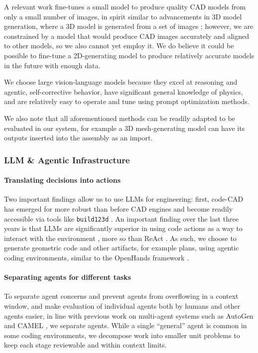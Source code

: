 \documentclass[conference]{IEEEtran}
\begin{document}
A relevant work \cite{ref39} fine-tunes a small model to produce quality CAD models from only a small number of images, in spirit similar to advancements in 3D model generation, where a 3D model is generated from a set of images \cite{ref38}; however, we are constrained by a model that would produce CAD images accurately and aligned to other models, so we also cannot yet employ it. We do believe it could be possible to fine-tune a 2D-generating model to produce relatively accurate models in the future with enough data.

We choose large vision-language models because they excel at reasoning and agentic, self-corrective behavior, have significant general knowledge of physics, and are relatively easy to operate and tune using prompt optimization methods.

We also note that all aforementioned methods can be readily adapted to be evaluated in our system, for example a 3D mesh-generating model can have its outputs inserted into the assembly as an import.

\subsubsection{LLM \& Agentic Infrastructure}
\paragraph{Translating decisions into actions}
Two important findings allow us to use LLMs for engineering: first, code-CAD has emerged for more robust than before CAD engines and become readily accessible via tools like \texttt{build123d} \cite{ref4}. An important finding over the last three years is that LLMs are significantly superior in using code actions as a way to interact with the environment \cite{ref23}, more so than ReAct \cite{ref16}. As such, we choose to generate geometric code and other artifacts, for example plans, using agentic coding environments, similar to the OpenHands framework \cite{ref9}.

\paragraph{Separating agents for different tasks}
To separate agent concerns and prevent agents from overflowing in a context window, and make evaluation of individual agents both by humans and other agents easier, in line with previous work on multi-agent systems such as AutoGen \cite{ref24} and CAMEL \cite{ref25}, we separate agents. While a single ``general'' agent is common in some coding environments, we decompose work into smaller unit problems to keep each stage reviewable and within context limits.
\end{document}
